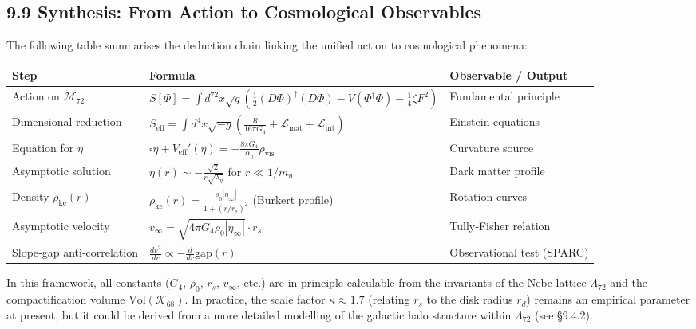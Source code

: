 \documentclass[11pt]{article}
\let\oldmathcal\mathcal
\renewcommand{\mathcal}[1]{\oldmathcal{#1}}
\let\Box\square
\providecommand{\Box}{\square}
\begin{document}
\hypertarget{synthesis-from-action-to-cosmological-observables}{%
\subsection{9.9 Synthesis: From Action to Cosmological
Observables}\label{synthesis-from-action-to-cosmological-observables}}

The following table summarises the deduction chain linking the unified
action to cosmological phenomena:

\begin{table}[H]
\centering
\begin{tabular}{@{}lll@{}}
\toprule
\textbf{Step} & \textbf{Formula} & \textbf{Observable / Output} \\
\midrule
Action on $\mathcal{M}_{72}$ & $S[\Phi] = \int d^{72}x \sqrt{g} \left( \frac{1}{2}(D\Phi)^\dagger(D\Phi) - V(\Phi^\dagger\Phi) - \frac{1}{4}\zeta F^2 \right)$ & Fundamental principle \\
Dimensional reduction & $S_{\text{eff}} = \int d^4x \sqrt{-g} \left( \frac{R}{16\pi G_4} + \mathcal{L}_{\text{mat}} + \mathcal{L}_{\text{int}} \right)$ & Einstein equations \\
Equation for $\eta$ & $\Box \eta + V_{\text{eff}}'(\eta) = -\frac{8\pi G_4}{\alpha_\eta} \rho_{\text{vis}}$ & Curvature source \\
Asymptotic solution & $\eta(r) \sim - \frac{\sqrt{2}}{r\sqrt{\lambda_\eta}}$ for $r \ll 1/m_\eta$ & Dark matter profile \\
Density $\rho_{\text{ke}}(r)$ & $\rho_{\text{ke}}(r) = \frac{\rho_0 |\eta_\infty|}{1 + (r/r_s)^2}$ (Burkert profile) & Rotation curves \\
Asymptotic velocity & $v_\infty = \sqrt{4\pi G_4 \rho_0 |\eta_\infty|} \cdot r_s$ & Tully‑Fisher relation \\
Slope‑gap anti‑correlation & $\displaystyle \frac{d v^2}{dr} \propto - \frac{d}{dr}\text{gap}(r)$ & Observational test (SPARC) \\
\bottomrule
\end{tabular}
\end{table}

In this framework, all constants (\(G_4\), \(\rho_0\), \(r_s\),
\(v_\infty\), etc.) are in principle calculable from the invariants of
the Nebe lattice \(\Lambda_{72}\) and the compactification volume
\(\text{Vol}(\mathcal{K}_{68})\). In practice, the scale factor
\(\kappa \approx 1.7\) (relating \(r_s\) to the disk radius \(r_d\))
remains an empirical parameter at present, but it could be derived from
a more detailed modelling of the galactic halo structure within
\(\Lambda_{72}\) (see §9.4.2).
\end{document}
